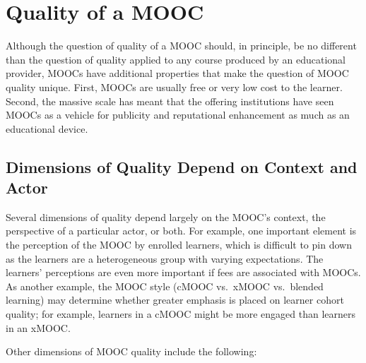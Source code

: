 \section{Quality of a MOOC}


Although the question of quality of a MOOC should, in principle, be no
different than the question of quality applied to any course produced by
an educational provider, MOOCs have additional properties that make the
question of MOOC quality unique. First, MOOCs are usually free or very
low cost to the learner. Second, the massive scale has meant that the
offering institutions have seen MOOCs as a vehicle for publicity and
reputational enhancement as much as an educational device.



\subsection{Dimensions of Quality Depend on Context and Actor}

Several dimensions of quality depend largely on the
MOOC's context, the perspective of a particular actor, or both.
For example, one important element is the perception of the MOOC by
enrolled learners,
which is difficult to pin down as the learners are a heterogeneous group
with varying expectations. 
The learners' perceptions are even more important 
if fees are associated with MOOCs.  
As another example, the MOOC style (cMOOC vs.\ xMOOC vs.\
blended learning) may determine whether greater emphasis is placed on
learner cohort quality; for example, learners in a
cMOOC might be more engaged than learners in an xMOOC.

Other dimensions of
MOOC quality include the following:

